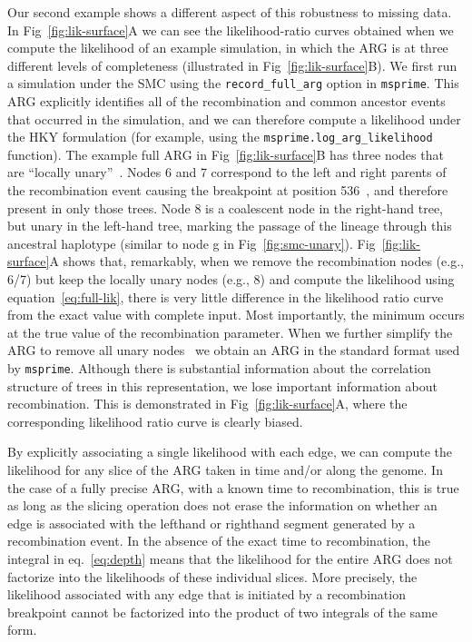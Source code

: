 \documentclass{article}
\begin{document}
Our second example shows a different aspect of this robustness to missing 
data. In Fig~\ref{fig:lik-surface}A we can see the likelihood-ratio curves
obtained when we compute the likelihood of an example simulation,
in which the ARG is at three different levels of completeness
(illustrated in Fig~\ref{fig:lik-surface}B).
We first run a simulation under the SMC
using the \texttt{record\_full\_arg} option in \texttt{msprime}. This 
ARG explicitly identifies all of the recombination and common 
ancestor events that occurred in the simulation, and 
we can therefore compute a likelihood under the HKY formulation
(for example, using the \texttt{msprime.log\_arg\_likelihood} 
function). The example full ARG in 
Fig~\ref{fig:lik-surface}B has three nodes that are ``locally
unary''~\citep{wong_general_2023}. Nodes 6 and 7 correspond to the 
left and right parents of the recombination event causing the 
breakpoint at position 536~\cite[we need two nodes to uniquely identify
 the passage of ancestral material through recombination 
events; see][]{baumdicker_efficient_2021}, and therefore present
in only those trees. 
Node 8 is a coalescent node in the right-hand tree, but unary
in the left-hand tree, marking the passage of the lineage through
this ancestral haplotype (similar to node g in Fig~\ref{fig:smc-unary}).
Fig~\ref{fig:lik-surface}A shows that, remarkably, when we 
remove the recombination nodes (e.g., 6/7) but keep the locally unary nodes (e.g., 8)
and compute the likelihood using equation~\eqref{eq:full-lik},
there is very little difference in the likelihood ratio
curve from the exact value with complete input. 
Most importantly, the minimum occurs at the true value of the 
recombination parameter.
When we further simplify
the ARG to remove all unary nodes~\citep{wong_general_2023,kelleher_efficient_2018} 
we obtain an ARG in the standard format used by \texttt{msprime}.
Although there is substantial information about the correlation
structure of trees in this representation, we lose important
information about recombination. This is demonstrated in 
Fig~\ref{fig:lik-surface}A, where the corresponding likelihood ratio curve
is clearly biased. 

By explicitly associating a single likelihood with each edge,
we can compute the likelihood for any slice of the ARG taken in
time and/or along the genome.
In the case of a fully precise ARG, with a known time to recombination,
this is true as long as the slicing operation does not erase the
information on whether an edge is associated with the lefthand or
righthand segment generated by a recombination event. In the absence
of the exact time to recombination, the integral in
eq.~\eqref{eq:depth} means that the likelihood
for the entire ARG does not factorize into the likelihoods of these
individual slices. More precisely, the likelihood associated with any
edge that is initiated by a recombination breakpoint cannot be factorized
into the product of two integrals of the same form.
\end{document}
